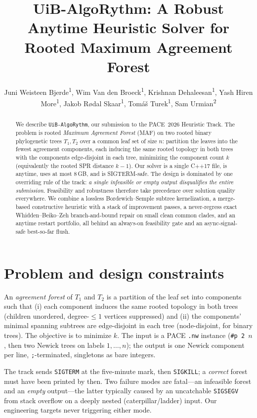 \documentclass[a4paper,UStitle,numberwithinsect=false,autoref]{lipics-v2021}
\title{UiB-AlgoRythm: A Robust Anytime Heuristic Solver for\\ Rooted Maximum Agreement Forest}
\author{%
Juni Weisteen Bjerde\textsuperscript{1},
Wim Van den Broeck\textsuperscript{1},
Krishnan Dehaleesan\textsuperscript{1},
Yash Hiren More\textsuperscript{1},
Jakob R{\o}dal Skaar\textsuperscript{1},
Tom\'a\v{s} Turek\textsuperscript{1},
Sam Urmian\textsuperscript{2}%
}{%
\textsuperscript{1}\,Department of Informatics, University of Bergen, Norway \\
\textsuperscript{2}\,Department of Informatics and Centre for the Science of Learning \& Technology (SLATE), University of Bergen, Norway \\
\textnormal{\footnotesize
\nolinkurl{juni.bjerde@uib.no},
\nolinkurl{wim.broeck@uib.no},
\nolinkurl{krishnan.dehaleesan@uib.no},
\nolinkurl{yash.h.more@uib.no},
\nolinkurl{jakob.r.skaar@student.uib.no},
\nolinkurl{tomas.turek@uib.no},
\nolinkurl{sam.urmian@uib.no}~(contact)}%
}{}{}{}
\begin{document}
\maketitle

\begin{abstract}
We describe \texttt{UiB-AlgoRythm}, our submission to the
PACE~2026 Heuristic Track. The problem is rooted \emph{Maximum Agreement Forest}
(MAF) on two rooted binary phylogenetic trees $T_1,T_2$ over a common leaf set of
size $n$: partition the leaves into the fewest agreement components, each inducing
the same rooted topology in both trees with the components edge-disjoint in each
tree, minimizing the component count $k$ (equivalently the rooted SPR distance
$k-1$). Our solver is a single C++17 file, is anytime, uses at most $8$\,GB, and is
SIGTERM-safe. The design is dominated by one overriding rule of the track:
\emph{a single infeasible or empty output disqualifies the entire submission}.
Feasibility and robustness therefore take precedence over solution quality
everywhere. We combine a lossless Bordewich--Semple subtree kernelization, a
merge-based constructive heuristic with a stack of improvement passes, a
never-regress exact Whidden--Beiko--Zeh branch-and-bound repair on small clean
common clades, and an anytime restart portfolio, all behind an always-on
feasibility gate and an async-signal-safe best-so-far flush.
\end{abstract}

\section{Problem and design constraints}

An \emph{agreement forest} of $T_1$ and $T_2$ is a partition of the leaf set into
components such that (i) each component induces the same rooted topology in both trees
(children unordered, degree-$\le 1$ vertices suppressed) and (ii) the components'
minimal spanning subtrees are edge-disjoint in each tree (node-disjoint, for binary
trees). The objective is to minimize $k$. The input is a PACE \texttt{.nw} instance
(\texttt{\#p 2 $n$}, then two Newick trees on labels $1,\dots,n$); the output is one
Newick component per line, \texttt{;}-terminated, singletons as bare integers.

The track sends \texttt{SIGTERM} at the five-minute mark, then \texttt{SIGKILL}; a
\emph{correct} forest must have been printed by then. Two failure modes are
fatal---an infeasible forest and an \emph{empty} output---the latter typically caused
by an uncatchable \texttt{SIGSEGV} from stack overflow on a deeply nested
(caterpillar/ladder) input. Our engineering targets never triggering either mode.
\end{document}
